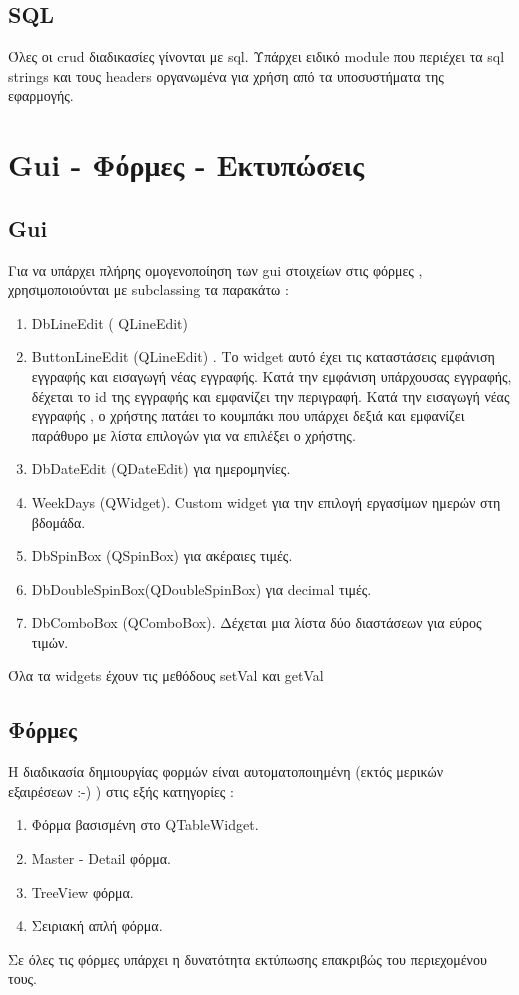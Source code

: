 \documentclass[A4,10pt,greek]{book}
\begin{document}
\subsection{SQL}
Όλες οι crud διαδικασίες γίνονται με sql. Υπάρχει ειδικό module που περιέχει τα sql strings και τους headers οργανωμένα για χρήση από τα υποσυστήματα της εφαρμογής.
\section{Gui - Φόρμες - Εκτυπώσεις}
\subsection{Gui}
Για να υπάρχει πλήρης ομογενοποίηση των gui στοιχείων στις φόρμες , χρησιμοποιούνται με subclassing τα παρακάτω :
\begin{enumerate}
\item DbLineEdit ( QLineEdit)
\item ButtonLineEdit (QLineEdit) . Το widget αυτό έχει τις καταστάσεις  εμφάνιση εγγραφής και εισαγωγή νέας εγγραφής. Κατά την εμφάνιση υπάρχουσας εγγραφής, δέχεται το id της εγγραφής και εμφανίζει την περιγραφή. Κατά την εισαγωγή νέας εγγραφής , ο χρήστης πατάει το κουμπάκι που υπάρχει δεξιά και εμφανίζει παράθυρο με λίστα επιλογών για να επιλέξει ο χρήστης. 
\item DbDateEdit (QDateEdit) για ημερομηνίες.  
\item WeekDays (QWidget). Custom widget για την επιλογή εργασίμων ημερών στη βδομάδα.
\item DbSpinBox (QSpinBox) για ακέραιες τιμές.
\item DbDoubleSpinBox(QDoubleSpinBox) για decimal τιμές.
\item DbComboBox (QComboBox). Δέχεται μια λίστα δύο διαστάσεων για εύρος τιμών.
\end{enumerate}
Όλα τα widgets έχουν τις μεθόδους setVal και getVal
\subsection{Φόρμες}
Η διαδικασία δημιουργίας φορμών είναι αυτοματοποιημένη (εκτός μερικών εξαιρέσεων :-) ) στις εξής κατηγορίες :
\begin{enumerate}
\item Φόρμα βασισμένη στο QTableWidget.
\item Master - Detail φόρμα.
\item TreeView φόρμα.
\item Σειριακή απλή φόρμα.
\end{enumerate}
Σε όλες τις φόρμες υπάρχει η δυνατότητα εκτύπωσης επακριβώς του περιεχομένου τους.
\end{document}
